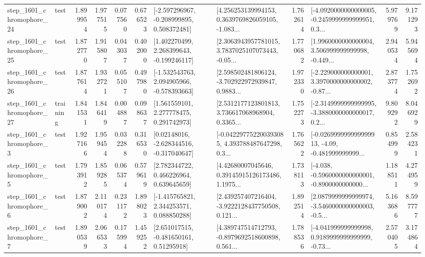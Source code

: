 \begin{tabular}{llrrrrllrlrr}
 step\_1601\_chromophore\_24 &      test &      1.899954 &    1.977515 &      0.077560 &  0.676523 &   [-2.597296967, -0.208999895, 0.508372481] &  [4.256253139994153, 0.3639769826059105, -1.083... &       1.762614 &  [-4.0920000000000005, -0.2459999999999951, 0.3... &            5.979769 &          9.171293 \\
 step\_1601\_chromophore\_25 &      test &      1.872770 &    1.915807 &      0.043037 &  0.402000 &    [1.402270499, 2.268399643, -0.199246117] &  [2.3063943957781015, 3.7837025107073443, -0.05... &       1.770682 &  [1.9960000000000004, 3.506999999999998, -0.449... &            2.940534 &          5.945694 \\
 step\_1601\_chromophore\_26 &      test &      1.877614 &    1.932721 &      0.055107 &  0.497980 &   [-1.532543763, 2.094905966, -0.578393663] &  [2.598502481806124, -3.702922972939847, 0.9883... &       1.972330 &  [-2.229000000000001, 3.3970000000000002, -0.87... &            2.873774 &          1.752692 \\
 step\_1601\_chromophore\_27 &  training &      1.841531 &    1.846419 &      0.004887 &  0.098637 &     [1.561559101, 2.277778475, 0.291742973] &  [2.5312177123801813, 3.736617068968904, 0.3365... &       1.752273 &  [-2.3149999999999995, -3.3880000000000017, 0.2... &            9.809292 &          8.046929 \\
  step\_1601\_chromophore\_3 &      test &      1.927166 &    1.959454 &      0.032288 &  0.316530 &    [0.02148016, -2.628344516, -0.317040647] &  [-0.042297752200393085, 4.393788487647298, 0.3... &       1.765622 &  [-0.026999999999999913, -4.09, -0.481999999999... &            0.854999 &          2.584231 \\
  step\_1601\_chromophore\_5 &      test &      1.793912 &    1.859285 &      0.065374 &  0.579619 &     [2.782344722, 0.466226964, 0.639645659] &  [4.42680007045646, 0.39145915126173486, 1.1975... &       1.738113 &  [-4.038, -0.5960000000000001, -0.8900000000000... &            1.188511 &          4.274959 \\
  step\_1601\_chromophore\_6 &      test &      1.879002 &    2.110174 &      0.231172 &  1.898023 &    [-1.415765821, 2.344253571, 0.088850288] &  [2.439257407216404, -3.9222128437750508, 0.121... &       1.892514 &  [2.0879999999999974, -3.5460000000000003, -0.5... &            5.163686 &          8.597777 \\
  step\_1601\_chromophore\_7 &      test &      1.890539 &    2.066533 &      0.175994 &  1.459252 &     [2.651017515, -0.481650161, 0.51295918] &  [4.389747514712793, -0.8979692518600898, 0.561... &       1.788536 &  [-4.041999999999998, 0.9189999999999999, -0.73... &            2.570405 &          3.174864 \\

\end{tabular}
